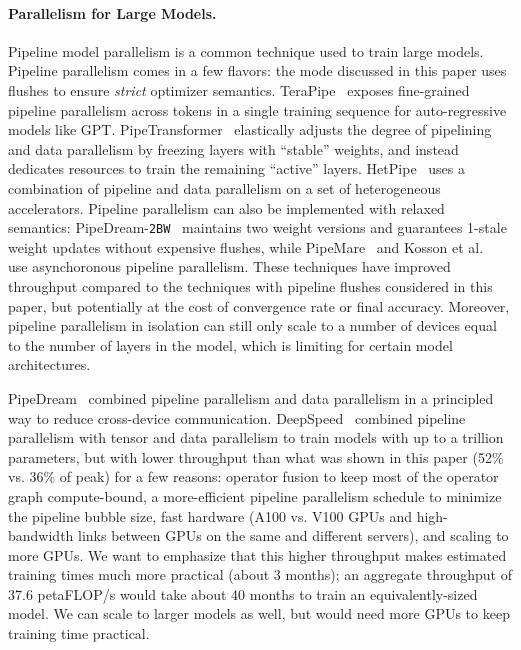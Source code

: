 \documentclass[sigconf,nonacm]{acmart}
\begin{document}
\paragraph{Parallelism for Large Models.} Pipeline model parallelism is a common technique used to train large models. Pipeline parallelism comes in a few flavors: the mode discussed in this paper uses flushes to ensure \emph{strict} optimizer semantics. TeraPipe~\cite{li2021terapipe} exposes fine-grained pipeline parallelism across tokens in a single training sequence for auto-regressive models like GPT. PipeTransformer~\cite{he2021pipetransformer} elastically adjusts the degree of pipelining and data parallelism by freezing layers with ``stable'' weights, and instead dedicates resources to train the remaining ``active'' layers. HetPipe~\cite{park2020hetpipe} uses a combination of pipeline and data parallelism on a set of heterogeneous accelerators. Pipeline parallelism can also be implemented with relaxed semantics: PipeDream-\texttt{2BW}~\cite{narayanan2021memory} maintains two weight versions and guarantees 1-stale weight updates without expensive flushes, while PipeMare~\cite{yang2021pipemare} and Kosson et al.~\cite{pb2021kosson} use asynchoronous pipeline parallelism. These techniques have improved throughput compared to the techniques with pipeline flushes considered in this paper, but potentially at the cost of convergence rate or final accuracy. Moreover, pipeline parallelism in isolation can still only scale to a number of devices equal to the number of layers in the model, which is limiting for certain model architectures.

PipeDream~\cite{narayanan2019pipedream} combined pipeline parallelism and data parallelism in a principled way to reduce cross-device communication. DeepSpeed~\cite{deepspeed3Dparallelism} combined pipeline parallelism with tensor and data parallelism to train models with up to a trillion parameters, but with lower throughput than what was shown in this paper (52\% vs. 36\% of peak) for a few reasons: operator fusion to keep most of the operator graph compute-bound, a more-efficient pipeline parallelism schedule to minimize the pipeline bubble size, fast hardware (A100 vs. V100 GPUs and high-bandwidth links between GPUs on the same and different servers), and scaling to more GPUs. We want to emphasize that this higher throughput makes estimated training times much more practical (about 3 months); an aggregate throughput of 37.6 petaFLOP/s would take about 40 months to train an equivalently-sized model. We can scale to larger models as well, but would need more GPUs to keep training time practical.
\end{document}
